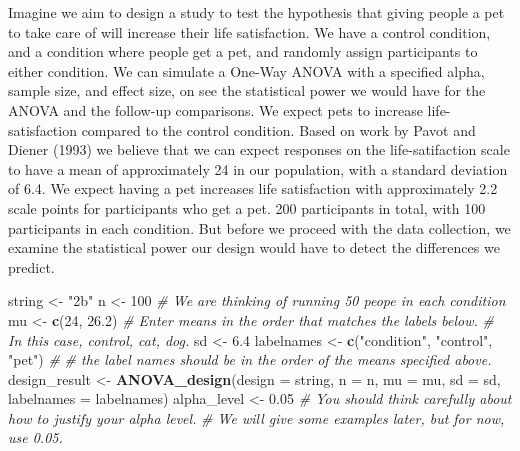 \documentclass[]{book}
\newenvironment{Shaded}{\begin{snugshade}}{\end{snugshade}}
\newcommand{\CommentTok}[1]{\textcolor[rgb]{0.56,0.35,0.01}{\textit{#1}}}
\newcommand{\DataTypeTok}[1]{\textcolor[rgb]{0.13,0.29,0.53}{#1}}
\newcommand{\DecValTok}[1]{\textcolor[rgb]{0.00,0.00,0.81}{#1}}
\newcommand{\FloatTok}[1]{\textcolor[rgb]{0.00,0.00,0.81}{#1}}
\newcommand{\KeywordTok}[1]{\textcolor[rgb]{0.13,0.29,0.53}{\textbf{#1}}}
\newcommand{\NormalTok}[1]{#1}
\newcommand{\StringTok}[1]{\textcolor[rgb]{0.31,0.60,0.02}{#1}}
\begin{document}
Imagine we aim to design a study to test the hypothesis that giving people a pet to take care of will increase their life satisfaction. We have a control condition, and a condition where people get a pet, and randomly assign participants to either condition. We can simulate a One-Way ANOVA with a specified alpha, sample size, and effect size, on see the statistical power we would have for the ANOVA and the follow-up comparisons. We expect pets to increase life-satisfaction compared to the control condition. Based on work by Pavot and Diener (1993) we believe that we can expect responses on the life-satifaction scale to have a mean of approximately 24 in our population, with a standard deviation of 6.4. We expect having a pet increases life satisfaction with approximately 2.2 scale points for participants who get a pet. 200 participants in total, with 100 participants in each condition. But before we proceed with the data collection, we examine the statistical power our design would have to detect the differences we predict.

\begin{Shaded}
\begin{Highlighting}[]
\NormalTok{string <-}\StringTok{ "2b"}
\NormalTok{n <-}\StringTok{ }\DecValTok{100}
\CommentTok{# We are thinking of running 50 peope in each condition}
\NormalTok{mu <-}\StringTok{ }\KeywordTok{c}\NormalTok{(}\DecValTok{24}\NormalTok{, }\FloatTok{26.2}\NormalTok{)}
\CommentTok{# Enter means in the order that matches the labels below.}
\CommentTok{# In this case, control, cat, dog. }
\NormalTok{sd <-}\StringTok{ }\FloatTok{6.4}
\NormalTok{labelnames <-}\StringTok{ }\KeywordTok{c}\NormalTok{(}\StringTok{"condition"}\NormalTok{, }\StringTok{"control"}\NormalTok{, }\StringTok{"pet"}\NormalTok{) }\CommentTok{#}
\CommentTok{# the label names should be in the order of the means specified above.}
\NormalTok{design_result <-}\StringTok{ }\KeywordTok{ANOVA_design}\NormalTok{(}\DataTypeTok{design =}\NormalTok{ string,}
                   \DataTypeTok{n =}\NormalTok{ n, }
                   \DataTypeTok{mu =}\NormalTok{ mu, }
                   \DataTypeTok{sd =}\NormalTok{ sd, }
                   \DataTypeTok{labelnames =}\NormalTok{ labelnames)}
\NormalTok{alpha_level <-}\StringTok{ }\FloatTok{0.05}
\CommentTok{# You should think carefully about how to justify your alpha level.}
\CommentTok{# We will give some examples later, but for now, use 0.05.}
\end{Highlighting}
\end{Shaded}
\end{document}
